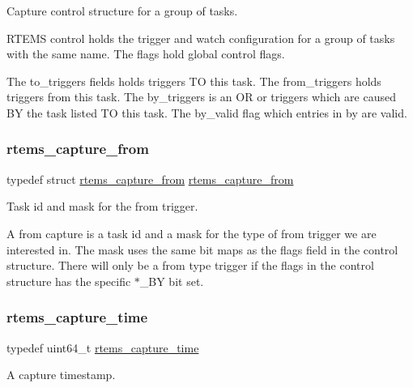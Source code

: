 Capture control structure for a group of tasks. 

R\+T\+E\+MS control holds the trigger and watch configuration for a group of tasks with the same name. The flags hold global control flags.

The to\+\_\+triggers fields holds triggers TO this task. The from\+\_\+triggers holds triggers from this task. The by\+\_\+triggers is an OR or triggers which are caused BY the task listed TO this task. The by\+\_\+valid flag which entries in by are valid. \mbox{\label{group__libmisc__capture_gabb9613c506ffe34885dccb4346fce2dc}} 
\subsubsection{\texorpdfstring{rtems\_capture\_from}{rtems\_capture\_from}}
{\footnotesize\ttfamily typedef struct \mbox{\hyperlink{structrtems__capture__from}{rtems\+\_\+capture\+\_\+from}}  \mbox{\hyperlink{structrtems__capture__from}{rtems\+\_\+capture\+\_\+from}}}



Task id and mask for the from trigger. 

A from capture is a task id and a mask for the type of from trigger we are interested in. The mask uses the same bit maps as the flags field in the control structure. There will only be a from type trigger if the flags in the control structure has the specific $\ast$\+\_\+\+BY bit set. \mbox{\label{group__libmisc__capture_gaf4cab587ea286bb2352fcfab9c223560}} 
\subsubsection{\texorpdfstring{rtems\_capture\_time}{rtems\_capture\_time}}
{\footnotesize\ttfamily typedef uint64\+\_\+t \mbox{\hyperlink{group__libmisc__capture_gaf4cab587ea286bb2352fcfab9c223560}{rtems\+\_\+capture\+\_\+time}}}



A capture timestamp. 

